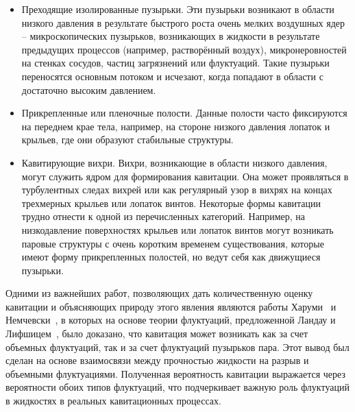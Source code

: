 \begin{itemize} 
    \item Преходящие изолированные пузырьки. Эти пузырьки возникают в области низкого давления в результате быстрого роста очень мелких воздушных ядер -- микроскопических пузырьков, возникающих в жидкости в результате предыдущих процессов (например, растворённый воздух), микронеровностей на стенках сосудов, частиц загрязнений или флуктуаций. Такие пузырьки переносятся основным потоком и исчезают, когда попадают в области с достаточно высоким давлением.
    \item Прикрепленные или пленочные полости. Данные полости часто фиксируются на переднем крае тела, например, на стороне низкого давления лопаток и крыльев, где они образуют стабильные структуры.
    \item Кавитирующие вихри. Вихри, возникающие в области низкого давления, могут служить ядром для формирования кавитации. Она может проявляться в турбулентных следах вихрей или как регулярный узор в вихрях на концах трехмерных крыльев или лопаток винтов. Некоторые формы кавитации трудно отнести к одной из перечисленных категорий. Например, на низкодавление поверхностях крыльев или лопаток винтов могут возникать паровые структуры с очень коротким временем существования, которые имеют форму прикрепленных полостей, но ведут себя как движущиеся пузырьки.  
\end{itemize}

Одними из важнейших работ, позволяющих дать количественную оценку кавитации и объясняющих природу этого явления являются работы Харуми~\cite{http://dx.doi.org/10.1121/1.409850} и Немчевски~\cite{10.1016/0041-624x(80)90021-9}, в которых на основе теории флуктуаций, предложенной Ландау и Лифшицем~\cite{landau1980statistical}, было доказано, что кавитация может возникать как за счет объемных флуктуаций, так и за счет флуктуаций пузырьков пара. Этот вывод был сделан на основе взаимосвязи между прочностью жидкости на разрыв и объемными флуктуациями. Полученная вероятность кавитации выражается через вероятности обоих типов флуктуаций, что подчеркивает важную роль флуктуаций в жидкостях в реальных кавитационных процессах.

